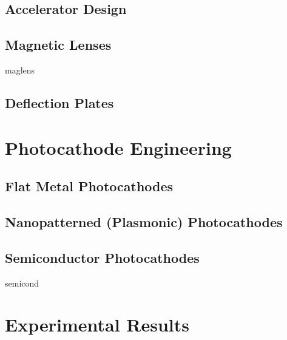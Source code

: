 \documentclass{uicthesi}
\begin{document}
\section{Accelerator Design}

\section{Magnetic Lenses}

  {maglens}

\section{Deflection Plates}

\chapter{Photocathode Engineering}

\section{Flat Metal Photocathodes}

\section{Nanopatterned (Plasmonic) Photocathodes}

\section{Semiconductor Photocathodes}

  {semicond}

\chapter{Experimental Results}

 


\end{document}
